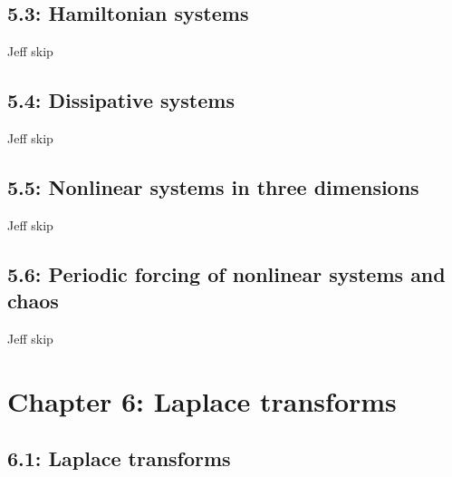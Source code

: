 \documentclass{article}
\begin{document}
\subsection{5.3: Hamiltonian systems}
Jeff skip

\subsection{5.4: Dissipative systems}
Jeff skip

\subsection{5.5: Nonlinear systems in three dimensions}
Jeff skip

\subsection{5.6: Periodic forcing of nonlinear systems and chaos}
Jeff skip


\section{Chapter 6: Laplace transforms}

\subsection{6.1: Laplace transforms}
\end{document}
